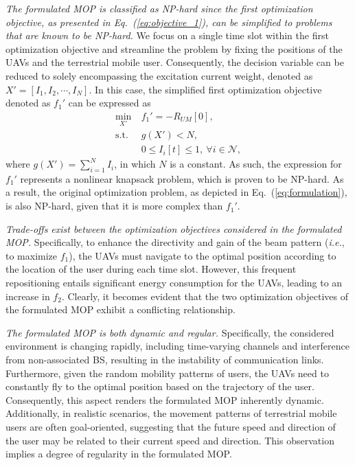\documentclass[10pt,journal,compsoc]{IEEEtran}
\begin{document}
\par \textit{The formulated MOP is classified as NP-hard since the first optimization objective, as presented in Eq.~(\ref{eq:objective_1}), can be simplified to problems that are known to be NP-hard.} We focus on a single time slot within the first optimization objective and streamline the problem by fixing the positions of the UAVs and the terrestrial mobile user. Consequently, the decision variable can be reduced to solely encompassing the excitation current weight, denoted as $X' = [I_1, I_2, \cdots, I_N ]$. In this case, the simplified first optimization objective denoted as $f_1'$ can be expressed as
    \begin{subequations}
    \begin{align}
        \underset{X'}{\min} \ & f_1' = -R_{UM}[0], \\
        \text{s.t.} \ & g(X') < N, \\
        \ & 0 \leq I_i[t] \leq 1, \ \forall i \in \mathcal{N},
    \end{align}
    \end{subequations}
    \noindent where $g(X') = \sum_{i=1}^N I_i$, in which $N$ is a constant. As such, the expression for $f_1'$ represents a nonlinear knapsack problem, which is proven to be NP-hard. As a result, the original optimization problem, as depicted in Eq.~(\ref{eq:formulation}), is also NP-hard, given that it is more complex than  $f_1'$.

\par \textit{Trade-offs exist between the optimization objectives considered in the formulated MOP.} Specifically, to enhance the directivity and gain of the beam pattern (\emph{i.e.}, to maximize $f_1$), the UAVs must navigate to the optimal position according to the location of the user during each time slot. However, this frequent repositioning entails significant energy consumption for the UAVs, leading to an increase in $f_2$. Clearly, it becomes evident that the two optimization objectives of the formulated MOP exhibit a conflicting relationship.

\par \textit{The formulated MOP is both dynamic and regular.} Specifically, the considered environment is changing rapidly, including time-varying channels and interference from non-associated BS, resulting in the instability of communication links. Furthermore, given the random mobility patterns of users, the UAVs need to constantly fly to the optimal position based on the trajectory of the user. Consequently, this aspect renders the formulated MOP inherently dynamic. Additionally, in realistic scenarios, the movement patterns of terrestrial mobile users are often goal-oriented, suggesting that the future speed and direction of the user may be related to their current speed and direction. This observation implies a degree of regularity in the formulated MOP.
\end{document}
